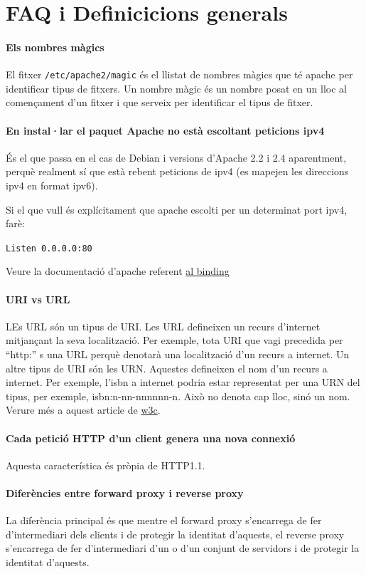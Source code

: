 \documentclass[a4paper, 11pt]{article}
\begin{document}
\section{FAQ i Definicicions generals}
\paragraph{Els nombres màgics }
El fitxer \verb+/etc/apache2/magic+ \'es el llistat de nombres màgics que t\'e apache per identificar tipus de fitxers. Un nombre màgic \'es un nombre posat en un lloc al començament d'un fitxer i que serveix per identificar el tipus de fitxer.

\paragraph{En instal·lar el paquet Apache no està escoltant peticions ipv4 } 
És el que passa en el cas de Debian i versions d'Apache 2.2 i 2.4 aparentment, perquè realment sí que està rebent peticions de ipv4 (es mapejen les direccions ipv4 en format ipv6). 

Si el que vull \'es explícitament que apache escolti per un determinat port ipv4, farè:

\verb+Listen 0.0.0.0:80+

Veure la documentació d'apache referent \href{http://httpd.apache.org/docs/2.4/bind.html}{al binding}\cite{DOC}

\paragraph{URI vs URL}
LEs URL són un tipus de URI. Les URL defineixen un recurs d'internet mitjançant la seva localització. Per exemple, tota URI que vagi precedida per “http:” s una URL perquè denotarà una localització d'un recurs a internet. 
Un altre tipus de URI són les URN. Aquestes defineixen el nom d'un recurs a internet. Per exemple, l'isbn a internet podria estar representat per una URN del tipus, per exemple, isbn:n-nn-nnnnnn-n. Això no denota cap lloc, sinó un nom.
Verure m\'es a aquest article de \href{http://www.w3.org/TR/uri-clarification/}{w3c}\cite{w3c}.

\paragraph{Cada petició HTTP d'un client genera una nova connexió}
Aquesta característica \'es pròpia de HTTP1.1.

\paragraph{Diferències entre forward proxy i reverse proxy}
La diferència principal \'es que mentre el forward proxy s'encarrega de fer d'intermediari dels clients i de protegir la identitat d'aquests, el reverse proxy s'encarrega de fer d'intermediari d'un o d'un conjunt de servidors i de protegir la identitat d'aquests.
\end{document}

